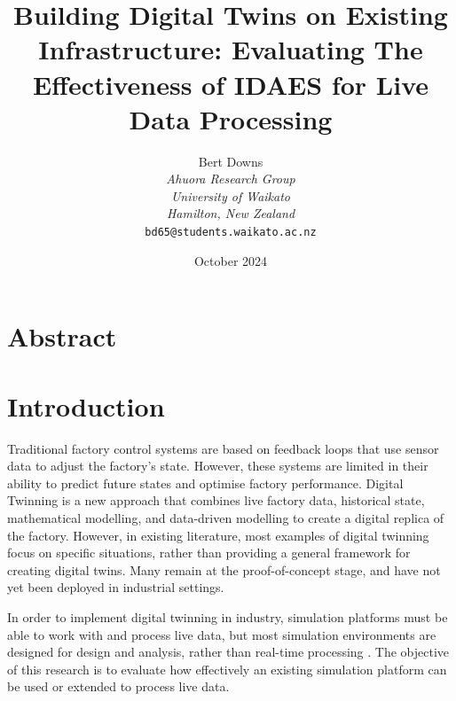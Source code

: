 \documentclass[12pt]{article}
\title{Building Digital Twins on Existing Infrastructure: Evaluating The Effectiveness of IDAES for Live Data Processing}
\author{Bert Downs\\
\textit{Ahuora Research Group}\\
\textit{University of Waikato}\\
\textit{Hamilton, New Zealand}\\
\texttt{bd65@students.waikato.ac.nz}}
\date{October 2024}
\begin{document}
\maketitle

\section*{Abstract}



\section{Introduction}


Traditional factory control systems are based on feedback loops that use sensor data to adjust the factory's state. However, these systems are limited in their ability to predict future states and optimise factory performance. Digital Twinning is a new approach that combines live factory data, historical state, mathematical modelling, and data-driven modelling to create a digital replica of the factory. 
However, in existing literature, most examples of digital twinning focus on specific situations, rather than providing a general framework for creating digital twins. Many remain at the proof-of-concept stage, and have not yet been deployed in industrial settings.

In order to implement digital twinning in industry, simulation platforms must be able to work with and process live data, but most simulation environments are designed for design and analysis, rather than real-time processing \cite{agi2024computational}. The objective of this research is to evaluate how effectively an existing simulation platform can be used or extended to process live data.
\end{document}
